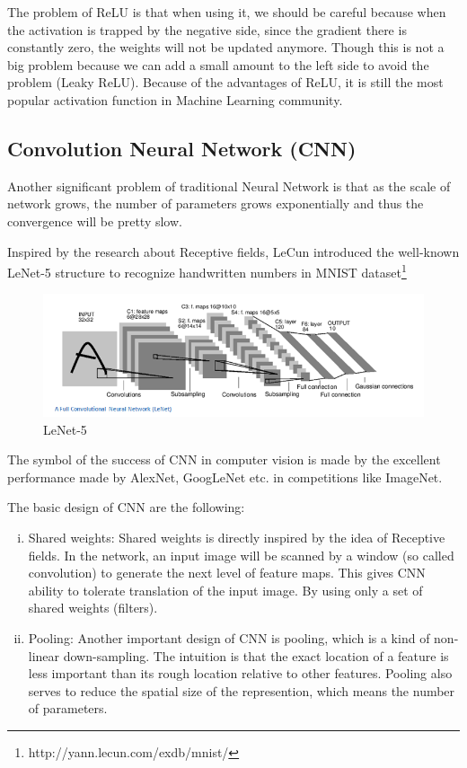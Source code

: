 \documentclass[10pt,twocolumn,letterpaper]{article}
\begin{document}
	The problem of ReLU is that when using it, we should be careful because when the activation is trapped by the negative side, since the gradient there is constantly zero, the weights will not be updated anymore. Though this is not a big problem because we can add a small amount to the left side to avoid the problem (Leaky ReLU). Because of the advantages of ReLU, it is still the most popular activation function in Machine Learning community\cite{gupta_bansal_srivastava_jain_2017}.
	
	\subsection{Convolution Neural Network (CNN)}
	Another significant problem of traditional Neural Network is that as the scale of network grows, the number of parameters grows exponentially and thus the convergence will be pretty slow.
	
	Inspired by the research about Receptive fields\cite{hubel1968receptive}, LeCun introduced the well-known LeNet-5 structure\cite{cun_jackel_boser_denker_graf_guyon_henderson_howard_hubbard_1990} to recognize handwritten numbers in MNIST dataset\footnote{http://yann.lecun.com/exdb/mnist/}
	
	\begin{figure}[h]
		\begin{center}
			\includegraphics[width=\linewidth]{images/lenet}
			\caption{LeNet-5}
		\end{center}
	\end{figure}
	
	The symbol of the success of CNN in computer vision is made by the excellent performance made by AlexNet\cite{kotsiantis2007supervised}, GoogLeNet\cite{DBLP:journals/corr/SzegedyLJSRAEVR14} etc. in competitions like ImageNet.
	
	The basic design of CNN are the following:
	
	\begin{enumerate}[(i)]
		\item Shared weights: Shared weights is directly inspired by the idea of Receptive fields. In the network, an input image will be scanned by a window (so called convolution) to generate the next level of feature maps. This gives CNN ability to tolerate translation of the input image. By using only a set of shared weights (filters).
		\item Pooling: Another important design of CNN is pooling, which is a kind of non-linear down-sampling. The intuition is that  the exact location of a feature is less important than its rough location relative to other features\cite{goodfellow_bengio_courville_2017}. Pooling also serves to reduce the spatial size of the represention, which means the number of parameters.
	\end{enumerate}
	
\end{document}

